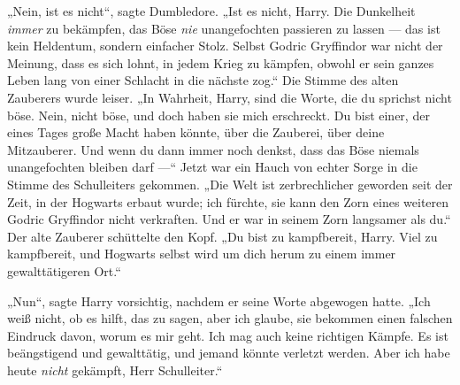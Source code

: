 „Nein, ist es nicht“, sagte Dumbledore.
„Ist es nicht, Harry. Die Dunkelheit \emph{immer} zu bekämpfen, das Böse \emph{nie} unangefochten passieren zu lassen — das ist kein Heldentum, sondern einfacher Stolz. Selbst Godric Gryffindor war nicht der Meinung, dass es sich lohnt, in jedem Krieg zu kämpfen, obwohl er sein ganzes Leben lang von einer Schlacht in die nächste zog.“ Die Stimme des alten Zauberers wurde leiser.
„In Wahrheit, Harry, sind die Worte, die du sprichst nicht böse. Nein, nicht böse, und doch haben sie mich erschreckt. Du bist einer, der eines Tages große Macht haben könnte, über die Zauberei, über deine Mitzauberer. Und wenn du dann immer noch denkst, dass das Böse niemals unangefochten bleiben darf —“ Jetzt war ein Hauch von echter Sorge in die Stimme des Schulleiters gekommen.
„Die Welt ist zerbrechlicher geworden seit der Zeit, in der Hogwarts erbaut wurde; ich fürchte, sie kann den Zorn eines weiteren Godric Gryffindor nicht verkraften. Und er war in seinem Zorn langsamer als du.“ Der alte Zauberer schüttelte den Kopf.
„Du bist zu kampfbereit, Harry. Viel zu kampfbereit, und Hogwarts selbst wird um dich herum zu einem immer gewalttätigeren Ort.“

„Nun“, sagte Harry vorsichtig, nachdem er seine Worte abgewogen hatte.
„Ich weiß nicht, ob es hilft, das zu sagen, aber ich glaube, sie bekommen einen falschen Eindruck davon, worum es mir geht. Ich mag auch keine richtigen Kämpfe. Es ist beängstigend und gewalttätig, und jemand könnte verletzt werden. Aber ich habe heute \emph{nicht} gekämpft, Herr Schulleiter.“

